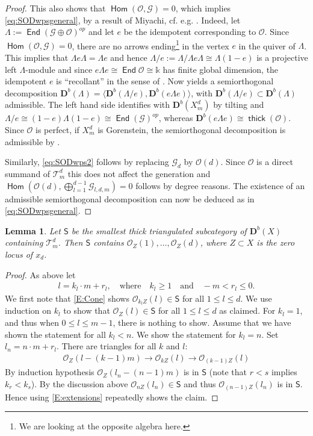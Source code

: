 \documentclass[a4paper,11pt, reqno]{amsart}
\def\DD{\mathbf D}
\def\OO{\mathcal O}
\def\sG{\mathscr{G}}
\def\sT{\mathscr{T}}
\newcommand{\opname}[1]{\operatorname{\mathsf{#1}}}
\newcommand{\Hom}{\opname{Hom}}
\newcommand{\End}{\opname{End}}
\newcommand{\op}{^{op}}
\newcommand{\thick}{\opname{thick}\nolimits}
\def\Db{\DD^b}
\theoremstyle{plain}
\newtheorem{lemma}[dummy]{Lemma}
\theoremstyle{definition}
\numberwithin{equation}{section}
\newlength{\arrow}
\begin{document}
\begin{proof}
This also shows that $\Hom(\OO, \sG)=0$, which implies \eqref{eq:SODwpsgeneral}, by a result of Miyachi, cf. e.g. \cite[Proposition 3.2] {HocheneggerKPloogRepArxiv}.
Indeed, let $\Lambda:=\End(\sG \oplus \OO)\op$ and let $e$ be the idempotent corresponding to $\OO$. Since $\Hom(\OO, \sG)=0$, there are no arrows ending\footnote{We are looking at the opposite algebra here.} in the vertex $e$ in the quiver of $\Lambda$. This implies that $\Lambda e \Lambda= \Lambda e$ and hence $\Lambda/e:=\Lambda/\Lambda e \Lambda \cong \Lambda(1-e)$ is a projective left $\Lambda$-module and since $e\Lambda e \cong \End \OO \cong \mathbb{k}$ has finite global dimension, the idempotent $e$ is ``recollant'' in the sense of \cite[Definition 3.1] {HocheneggerKPloogRepArxiv}. Now \cite[Proposition 3.2] {HocheneggerKPloogRepArxiv} yields a semiorthogonal decomposition
$\Db(\Lambda)=\langle \Db(\Lambda/e), \Db(e \Lambda e)\rangle $, with $\Db(\Lambda/e) \subset \Db(\Lambda)$ admissible. The left hand side identifies with $\Db(X_m^d)$ by tilting and $\Lambda/e \cong (1-e)\Lambda(1-e) \cong \End(\sG)\op$, whereas $\Db(e \Lambda e) \cong \thick(\OO)$. Since $\OO$ is perfect, if $X_m^d$ is Gorenstein, the semiorthogonal decomposition is  admissible by \cite[Lemma 2.15]{KPS}. 


Similarly, \eqref{eq:SODwps2} follows by replacing $\sG_d$ by $\OO(d)$. Since $\OO$ is a direct summand of $\sT_m^d$ this does not affect the generation and $\Hom(\OO(d), \bigoplus_{l=1}^{d-1} \sG_{l , d , m} )=0$ follows by degree reasons.
The existence of an admissible semiorthogonal decomposition can now be deduced as in \eqref{eq:SODwpsgeneral}. 
\end{proof}



\begin{lemma}\label{L:generation} 
Let $\mathsf{S}$ be the smallest thick triangulated subcategory of $\Db(X)$ containing $\sT_m^d$. Then $\mathsf{S}$
contains $\OO_Z(1), \ldots, \OO_Z(d)$, where $Z \subset X$ is the zero locus of $x_d$.
\end{lemma}
\begin{proof}
As above let 
\begin{align}
l=k_l \cdot m + r_l, \quad \text{where} \quad  k_l \geq 1 \quad \text{and} \quad  -m < r_l \leq 0. 
\end{align}
We first note that \eqref{E:Cone} shows $\OO_{k_lZ}(l) \in \mathsf{S}$ for all $1 \leq l \leq d$. 
We use induction on $k_l$ to show that $\OO_{Z}(l) \in \mathsf{S}$ for all $1 \leq l \leq d$ as claimed. For $k_l=1$, and thus when $0 \leq l \leq m-1 $, there is nothing to show. Assume that we have shown the statement for all $k_l<n$. We show the statement for $k_l=n$. Set $l_n = n \cdot m + r_l$. There are triangles for all $k$ and $l$:
\begin{align}\label{E:extensions}
\OO_Z(l- (k-1)m) \to \OO_{kZ}(l) \to \OO_{(k-1)Z}(l)
\end{align}
By induction hypothesis $\OO_Z(l_n -(n-1)m)$ is in $\mathsf{S}$ (note that $r<s$ implies $k_r<k_s$). By the discussion above $\OO_{n Z}(l_n ) \in \mathsf{S}$ and thus $\OO_{(n-1)Z}(l_n)$ is in $\mathsf{S}$. Hence using \eqref{E:extensions} 
repeatedly shows the claim.
\end{proof}
\end{document}
